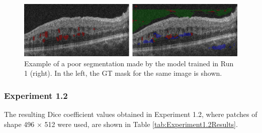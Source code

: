 \begin{figure}[!ht]
	\centering
	\includegraphics[width=1.0\linewidth]{figures/Experiment11Segmentation.png}
	\caption{Example of a poor segmentation made by the model trained in Run 1 (right). In the left, the GT mask for the same image is shown.}
	\label{fig:Experiment11Segmentation}
\end{figure}

\subsubsection{Experiment 1.2}

The resulting Dice coefficient values obtained in Experiment 1.2, where patches of shape 496 $\times$ 512 were used, are shown in Table \ref{tab:Experiment1.2Results}.

